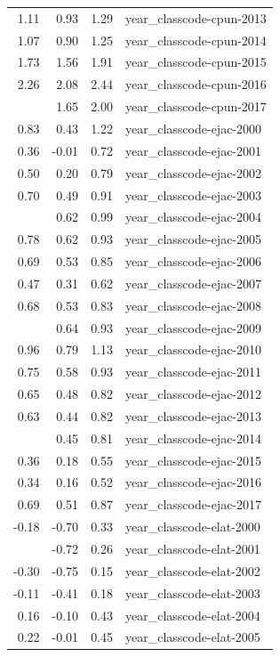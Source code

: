 \documentclass[]{article}
\begin{document}
\begin{longtable}[t]{rrrl}
1.11 & 0.93 & 1.29 & year\_classcode-cpun-2013\\
1.07 & 0.90 & 1.25 & year\_classcode-cpun-2014\\
1.73 & 1.56 & 1.91 & year\_classcode-cpun-2015\\
2.26 & 2.08 & 2.44 & year\_classcode-cpun-2016\\
\addlinespace
1.82 & 1.65 & 2.00 & year\_classcode-cpun-2017\\
0.83 & 0.43 & 1.22 & year\_classcode-ejac-2000\\
0.36 & -0.01 & 0.72 & year\_classcode-ejac-2001\\
0.50 & 0.20 & 0.79 & year\_classcode-ejac-2002\\
0.70 & 0.49 & 0.91 & year\_classcode-ejac-2003\\
\addlinespace
0.80 & 0.62 & 0.99 & year\_classcode-ejac-2004\\
0.78 & 0.62 & 0.93 & year\_classcode-ejac-2005\\
0.69 & 0.53 & 0.85 & year\_classcode-ejac-2006\\
0.47 & 0.31 & 0.62 & year\_classcode-ejac-2007\\
0.68 & 0.53 & 0.83 & year\_classcode-ejac-2008\\
\addlinespace
0.79 & 0.64 & 0.93 & year\_classcode-ejac-2009\\
0.96 & 0.79 & 1.13 & year\_classcode-ejac-2010\\
0.75 & 0.58 & 0.93 & year\_classcode-ejac-2011\\
0.65 & 0.48 & 0.82 & year\_classcode-ejac-2012\\
0.63 & 0.44 & 0.82 & year\_classcode-ejac-2013\\
\addlinespace
0.63 & 0.45 & 0.81 & year\_classcode-ejac-2014\\
0.36 & 0.18 & 0.55 & year\_classcode-ejac-2015\\
0.34 & 0.16 & 0.52 & year\_classcode-ejac-2016\\
0.69 & 0.51 & 0.87 & year\_classcode-ejac-2017\\
-0.18 & -0.70 & 0.33 & year\_classcode-elat-2000\\
\addlinespace
-0.23 & -0.72 & 0.26 & year\_classcode-elat-2001\\
-0.30 & -0.75 & 0.15 & year\_classcode-elat-2002\\
-0.11 & -0.41 & 0.18 & year\_classcode-elat-2003\\
0.16 & -0.10 & 0.43 & year\_classcode-elat-2004\\
0.22 & -0.01 & 0.45 & year\_classcode-elat-2005\\

\end{longtable}
\end{document}
